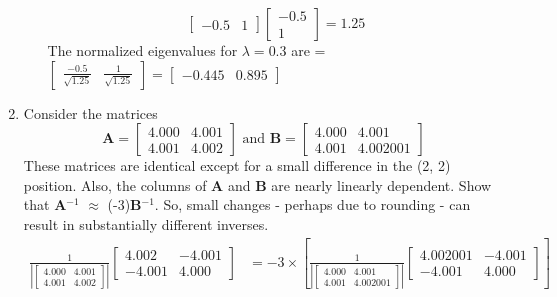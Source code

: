 \documentclass[12pt,a4paper]{paper}
\begin{document}
\begin{enumerate}
\begin{enumerate}
\begin{equation}
\left[\begin{array}{cc}-0.5 &  1\end{array}\right]\left[\begin{array}{c}-0.5 \\  1\end{array}\right] = 1.25
\end{equation}
The normalized eigenvalues for $\lambda = 0.3$ are = $\left[\begin{array}{cc}\frac{-0.5}{\sqrt{1.25}} &  \frac{1}{\sqrt{1.25}}\end{array}\right] = \left[\begin{array}{cc}-0.445 & 0.895\end{array}\right]$
\end{enumerate}
\item Consider the matrices \[ \textbf{A}= \left[ \begin{array}{cc}
4.000 & 4.001 \\
4.001 & 4.002
\end{array} \right]
\text{ and } 
\textbf{B}=\left[ \begin{array}{cc}
4.000 & 4.001 \\
4.001 & 4.002001
\end{array} \right]
\]
These matrices are identical except for a small difference in the (2, 2) position. Also, the columns of \textbf{A} and \textbf{B} are nearly linearly dependent. Show that \textbf{A}$^{-1}$ $\approx$ (-3)\textbf{B}$^{-1}$. So, small changes - perhaps due to rounding - can result in substantially different inverses.
\begin{equation}
\begin{split}
\frac{1}{\left|\left[ \begin{array}{cc}4.000 & 4.001 \\4.001 & 4.002\end{array} \right]\right|}\left[ \begin{array}{cc}4.002 & -4.001 \\-4.001 & 4.000\end{array} \right] & = -3\times\left[\frac{1}{\left|\left[ \begin{array}{cc}4.000 & 4.001 \\4.001 & 4.002001\end{array} \right]\right|}\left[ \begin{array}{cc}4.002001 & -4.001 \\-4.001 & 4.000 \end{array} \right]\right]\\

\end{split}
\end{equation}
\end{enumerate}
\end{document}
